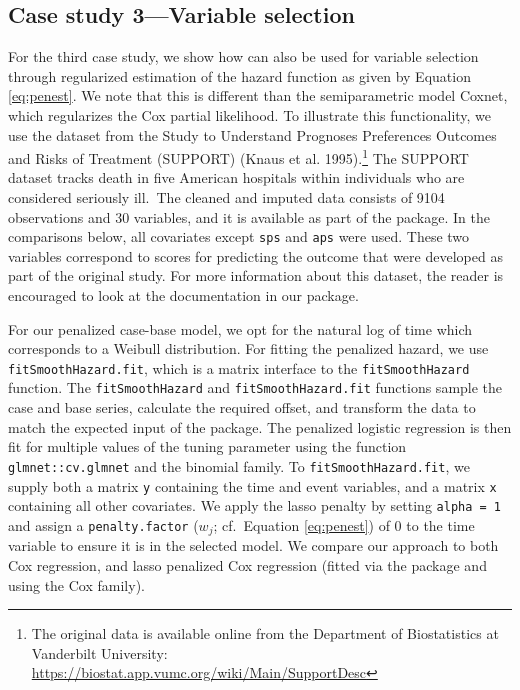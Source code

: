 \hypertarget{case-study-3variable-selection}{%
\subsection{Case study 3---Variable selection}\label{case-study-3variable-selection}}

For the third case study, we show how  can also be used for variable selection through regularized estimation of the hazard function as given by Equation \eqref{eq:penest}. We note that this is different than the semiparametric model Coxnet, which regularizes the Cox partial likelihood. To illustrate this functionality, we use the dataset from the Study to Understand Prognoses Preferences Outcomes and Risks of Treatment (SUPPORT) (Knaus et al. 1995).\footnote{The original data is available online from the Department of Biostatistics at Vanderbilt University: \url{https://biostat.app.vumc.org/wiki/Main/SupportDesc}} The SUPPORT dataset tracks death in five American hospitals within individuals who are considered seriously ill.~The cleaned and imputed data consists of 9104 observations and 30 variables, and it is available as part of the  package. In the comparisons below, all covariates except \texttt{sps} and \texttt{aps} were used. These two variables correspond to scores for predicting the outcome that were developed as part of the original study. For more information about this dataset, the reader is encouraged to look at the documentation in our package.

For our penalized case-base model, we opt for the natural log of time which corresponds to a Weibull distribution. For fitting the penalized hazard, we use \texttt{fitSmoothHazard.fit}, which is a matrix interface to the \texttt{fitSmoothHazard} function. The \texttt{fitSmoothHazard} and \texttt{fitSmoothHazard.fit} functions sample the case and base series, calculate the required offset, and transform the data to match the expected input of the  package. The penalized logistic regression is then fit for multiple values of the tuning parameter using the function \texttt{glmnet::cv.glmnet} and the binomial family. To \texttt{fitSmoothHazard.fit}, we supply both a matrix \texttt{y} containing the time and event variables, and a matrix \texttt{x} containing all other covariates. We apply the lasso penalty by setting \texttt{alpha\ =\ 1} and assign a \texttt{penalty.factor} (\(w_j\); cf.~Equation \eqref{eq:penest}) of 0 to the time variable to ensure it is in the selected model. We compare our approach to both Cox regression, and lasso penalized Cox regression (fitted via the  package and using the Cox family).

